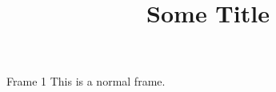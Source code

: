 \documentclass[aspectratio=169]{beamer}
\title{Some Title}
\begin{document}
	\begin{frame}
		\titlepage
	\end{frame}
	
	\begin{frame}{Frame 1}
		This is a normal frame.
	\end{frame}
\end{document}

